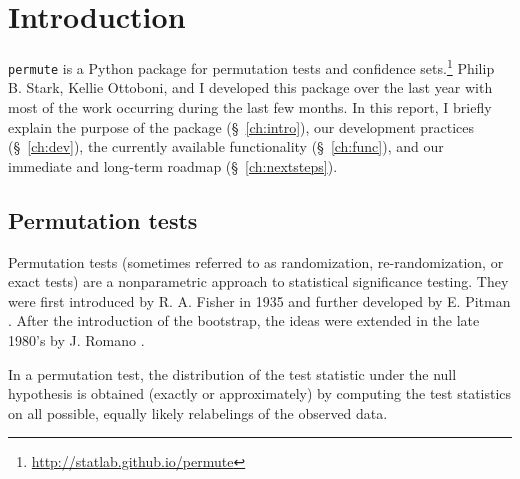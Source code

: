 \chapter{\label{ch:intro}Introduction}

\texttt{permute} is a Python package for permutation tests and confidence
sets.\footnote{\url{http://statlab.github.io/permute}}
Philip B. Stark, Kellie Ottoboni, and I developed this package over the
last year with most of the work occurring during the last few months.
In this report, I briefly explain the purpose of the package (\S~\ref{ch:intro}), our
development practices (\S~\ref{ch:dev}), the currently available functionality (\S~\ref{ch:func}), and
our immediate and long-term roadmap (\S~\ref{ch:nextsteps}).

\section{Permutation tests}

Permutation tests (sometimes referred to as randomization, re-randomization, or
exact tests) are a nonparametric approach to statistical significance testing.
They were first introduced by R. A. Fisher in 1935 \cite{fisher1935design} and
further developed by E.  Pitman  \cite{pitman1937, pitman1938significance}.
After the introduction of the bootstrap, the ideas were extended in the late
1980's by J. Romano \cite{romano1988bootstrap, romano1989bootstrap}.

In a permutation test, the distribution of the test statistic under the null
hypothesis is obtained (exactly or approximately) by computing the test
statistics on all possible, equally likely relabelings of the observed data. 


